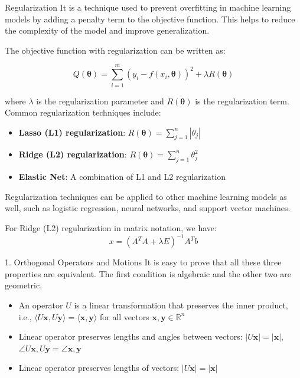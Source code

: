\documentclass[fullscreen=true, bookmarks=true, hyperref={pdfencoding=unicode}]{beamer}
\begin{document}
\begin{frame}{Regularization}
  \pause
  It is a technique used to prevent overfitting 
  in machine learning models by adding a penalty term to the objective function.
  This helps to reduce the complexity of the model and improve generalization.

  \pause
  The objective function with regularization can be written as:

  $$Q(\boldsymbol{\theta}) = \sum_{i=1}^{m} (y_i - f(x_i, \boldsymbol{\theta}))^2 + \lambda R(\boldsymbol{\theta})$$

  where $\lambda$ is the regularization parameter and $R(\boldsymbol{\theta})$ is the regularization term. Common regularization techniques include:

  \begin{itemize}
    \item \textbf{Lasso (L1) regularization}: $R(\boldsymbol{\theta}) = \sum_{j=1}^{n} |\theta_j|$
    \pause\item \textbf{Ridge (L2) regularization}: $R(\boldsymbol{\theta}) = \sum_{j=1}^{n} \theta_j^2$
    \pause\item \textbf{Elastic Net}: A combination of L1 and L2 regularization
  \end{itemize}

  \pause
  {\small 
  Regularization techniques can be applied to other machine learning models 
  as well, such as logistic regression, neural networks, and 
  support vector machines.}
\end{frame}


\begin{frame}
  For Ridge (L2) regularization in matrix notation, we have:
  $$ x = \left(A^TA + \lambda E \right)^{-1}A^Tb $$
\end{frame}


\begin{frame}{1. Orthogonal Operators and Motions}
  It is easy to prove that all these three properties are equivalent. 
  The first condition is algebraic and the other two are geometric. 

  \begin{itemize}
    \pause\item An operator $U$ is a linear transformation 
    that preserves the inner product, i.e., 
    $\langle U\boldsymbol{x}, U\boldsymbol{y} \rangle = \langle \boldsymbol{x}, 
    \boldsymbol{y} \rangle$ for all vectors 
    $\boldsymbol{x}, \boldsymbol{y} \in \mathbb{R}^n$
    \pause\item Linear operator preserves lengths and angles between vectors:
    $ |U\boldsymbol{x}| = |\boldsymbol{x}|$, 
    $\angle U\boldsymbol{x}, U\boldsymbol{y} = \angle \boldsymbol{x}, 
    \boldsymbol{y}$
    \pause\item Linear operator preserves lengths of vectors: 
    $ |U\boldsymbol{x}| = |\boldsymbol{x}|$
  \end{itemize}

\end{frame}
\end{document}

